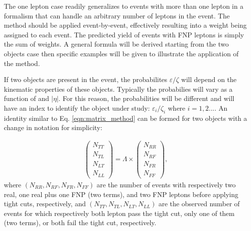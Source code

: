 The one lepton case readily generalizes to events with more than one lepton
in a formalism that can handle an arbitrary number of leptons 
in the event. The method should be applied event-by-event, effectively 
resulting into a weight being assigned to each event. The predicted yield of 
events with FNP leptons is simply the sum of weights.
A general formula will be derived starting from the two objects case 
then specific examples will be given to illustrate the application of the 
method.

If two objects are present in the event, the probabilites $\varepsilon/\zeta$
will depend on the kinematic properties of these objects. Typically 
the probabilies will vary as a function of \pt and $|\eta|$. For this reason,
the probabilities will be different and will have an index to 
identify the object under study: 
 $\varepsilon_i/\zeta_i$ where $i=1,2...$. 
An identity similar to Eq.  \ref{eqn:matrix_method} can be formed for 
two objects with a change in notation for simplicity:

\begin{align}
\left(\begin{array}{c}
N_{TT} \\  N_{TL} \\ N_{LT} \\ N_{LL}
\end{array}\right) = 
\Lambda \times 
\left(\begin{array}{c}
N_{RR} \\  N_{RF} \\ N_{FR} \\ N_{FF}
\end{array}\right), 
\label{eq:mxm_start}
\end{align}
where $(N_{RR},N_{RF},N_{FR},N_{FF})$ are the number of events with respectively two real, one real plus one FNP (two terms), and two FNP leptons before applying tight cuts, respectively, and $(N_{TT},N_{TL},N_{LT},N_{LL})$ are the observed number of events for which respectively both lepton pass the tight cut, only one of them (two terms), or both fail the tight cut, respectively. 

